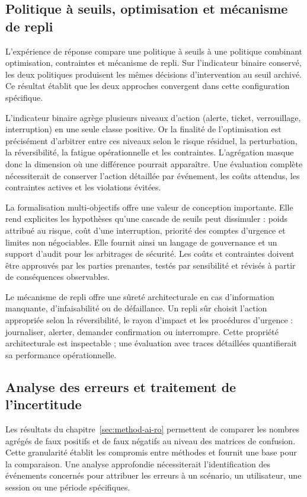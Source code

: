 \documentclass[11pt,a4paper,oneside]{report}
\theoremstyle{definition}
\theoremstyle{plain}
\begin{document}
\subsection{Politique à seuils, optimisation et mécanisme de repli}
\label{sec:validation-response}

L'expérience de réponse compare une politique à seuils à une politique
combinant optimisation, contraintes et mécanisme de repli. Sur l'indicateur
binaire conservé, les deux politiques produisent les mêmes décisions
d'intervention au seuil archivé. Ce résultat établit que les deux approches
convergent dans cette configuration spécifique.

L'indicateur binaire agrège plusieurs niveaux d'action (alerte, ticket,
verrouillage, interruption) en une seule classe positive. Or la finalité de
l'optimisation est précisément d'arbitrer entre ces niveaux selon le risque
résiduel, la perturbation, la réversibilité, la fatigue opérationnelle et les
contraintes. L'agrégation masque donc la dimension où une différence pourrait
apparaître. Une évaluation complète nécessiterait de conserver l'action
détaillée par événement, les coûts attendus, les contraintes actives et les
violations évitées.

La formalisation multi-objectifs offre une valeur de conception importante.
Elle rend explicites les hypothèses qu'une cascade de seuils peut dissimuler :
poids attribué au risque, coût d'une interruption, priorité des comptes
d'urgence et limites non négociables. Elle fournit ainsi un langage de
gouvernance et un support d'audit pour les arbitrages de sécurité. Les coûts
et contraintes doivent être approuvés par les parties prenantes, testés par
sensibilité et révisés à partir de conséquences observables.

Le mécanisme de repli offre une sûreté architecturale en cas d'information
manquante, d'infaisabilité ou de défaillance. Un repli sûr choisit l'action
appropriée selon la réversibilité, le rayon d'impact et les procédures
d'urgence : journaliser, alerter, demander confirmation ou interrompre. Cette
propriété architecturale est inspectable ; une évaluation avec traces
détaillées quantifierait sa performance opérationnelle.


\subsection{Analyse des erreurs et traitement de l'incertitude}
\label{sec:validation-errors}

Les résultats du chapitre~\ref{sec:method-ai-ro} permettent de comparer les
nombres agrégés de faux positifs et de faux négatifs au niveau des matrices de
confusion. Cette granularité établit les compromis entre méthodes et fournit
une base pour la comparaison. Une analyse approfondie nécessiterait
l'identification des événements concernés pour attribuer les erreurs à un
scénario, un utilisateur, une session ou une période spécifiques.
\end{document}
